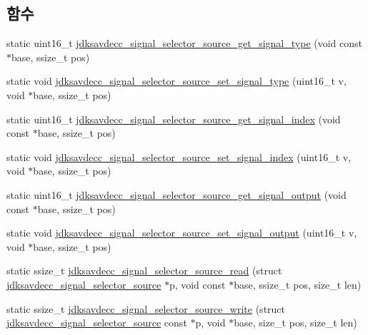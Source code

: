 \subsection*{함수}
\begin{DoxyCompactItemize}
\item 
static uint16\+\_\+t \hyperlink{group__signal__selector__source_ga478548268358a64f614121179a50fb0f}{jdksavdecc\+\_\+signal\+\_\+selector\+\_\+source\+\_\+get\+\_\+signal\+\_\+type} (void const $\ast$base, ssize\+\_\+t pos)
\item 
static void \hyperlink{group__signal__selector__source_ga74d79012e228c2fdd20d40ef592dc241}{jdksavdecc\+\_\+signal\+\_\+selector\+\_\+source\+\_\+set\+\_\+signal\+\_\+type} (uint16\+\_\+t v, void $\ast$base, ssize\+\_\+t pos)
\item 
static uint16\+\_\+t \hyperlink{group__signal__selector__source_ga6cbe5d2190536f8e2d16d509967d978d}{jdksavdecc\+\_\+signal\+\_\+selector\+\_\+source\+\_\+get\+\_\+signal\+\_\+index} (void const $\ast$base, ssize\+\_\+t pos)
\item 
static void \hyperlink{group__signal__selector__source_ga742a026cfa04f5a53a930be332d14792}{jdksavdecc\+\_\+signal\+\_\+selector\+\_\+source\+\_\+set\+\_\+signal\+\_\+index} (uint16\+\_\+t v, void $\ast$base, ssize\+\_\+t pos)
\item 
static uint16\+\_\+t \hyperlink{group__signal__selector__source_gafe235e06df2853057bf1c0499ecf71b6}{jdksavdecc\+\_\+signal\+\_\+selector\+\_\+source\+\_\+get\+\_\+signal\+\_\+output} (void const $\ast$base, ssize\+\_\+t pos)
\item 
static void \hyperlink{group__signal__selector__source_ga7ce44f1308fee173cc76701e4bc7db6d}{jdksavdecc\+\_\+signal\+\_\+selector\+\_\+source\+\_\+set\+\_\+signal\+\_\+output} (uint16\+\_\+t v, void $\ast$base, ssize\+\_\+t pos)
\item 
static ssize\+\_\+t \hyperlink{group__signal__selector__source_gadc0af91873311828f147505865c522bc}{jdksavdecc\+\_\+signal\+\_\+selector\+\_\+source\+\_\+read} (struct \hyperlink{structjdksavdecc__signal__selector__source}{jdksavdecc\+\_\+signal\+\_\+selector\+\_\+source} $\ast$p, void const $\ast$base, ssize\+\_\+t pos, size\+\_\+t len)
\item 
static ssize\+\_\+t \hyperlink{group__signal__selector__source_ga1a0eb5bd13f2749d9298e530b1886e3c}{jdksavdecc\+\_\+signal\+\_\+selector\+\_\+source\+\_\+write} (struct \hyperlink{structjdksavdecc__signal__selector__source}{jdksavdecc\+\_\+signal\+\_\+selector\+\_\+source} const $\ast$p, void $\ast$base, size\+\_\+t pos, size\+\_\+t len)
\end{DoxyCompactItemize}


